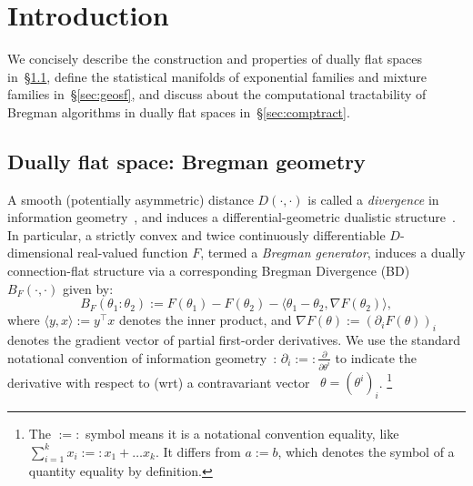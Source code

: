 \documentclass[graybox]{svmult}
\def\inner#1#2{{\langle #1,#2\rangle}}
\def\eqdef{:=}
\def\eqnota{:=:}
\begin{document}
\section{Introduction}

We concisely describe the construction and properties of dually flat spaces~\cite{IG-2014,IG-2016} in~\S\ref{sec:dfsbg}, 
define the statistical manifolds of exponential families and mixture families in~\S\ref{sec:geosf},  and discuss about the computational tractability of Bregman algorithms in dually flat spaces in~\S\ref{sec:comptract}.


\subsection{Dually flat space: Bregman geometry}\label{sec:dfsbg}
A smooth (potentially asymmetric) distance $D(\cdot,\cdot)$ is called a {\em divergence} in information geometry~\cite{IG-2014,IG-2016}, and induces a differential-geometric dualistic structure~\cite{Eguchi-1992,IGDiv-2010,IG-2014,IG-2016}. 
In particular, a strictly convex and twice continuously differentiable $D$-dimensional real-valued function $F$, termed a {\em Bregman generator}, induces 
a dually connection-flat structure via a corresponding  Bregman Divergence (BD)~\cite{Bregman-2005} $B_F(\cdot,\cdot)$ given by:  
\begin{equation}
B_F(\theta_1:\theta_2) \eqdef F(\theta_1)-F(\theta_2)-\inner{\theta_1-\theta_2}{\nabla F(\theta_2)},
\end{equation}
where $\inner{y}{x} \eqdef y^\top x$ denotes the inner product, and $\nabla F(\theta)\eqdef (\partial_i F(\theta))_i$ denotes the gradient vector of partial first-order derivatives. We use the standard notational convention of information geometry~\cite{IG-2014,IG-2016}: 
$\partial_i \eqnota \frac{\partial}{\partial \theta^i}$ to indicate
the derivative with respect to (wrt) a contravariant vector~\cite{tensor-2011} $\theta=(\theta^i)_i$.
\footnote{The $\eqnota$ symbol means it is a notational convention equality, like $\sum_{i=1}^k x_i \eqnota x_1+\ldots x_k$.
It differs from $a\eqdef b$, which denotes the symbol of a quantity equality by definition.}
\end{document}
